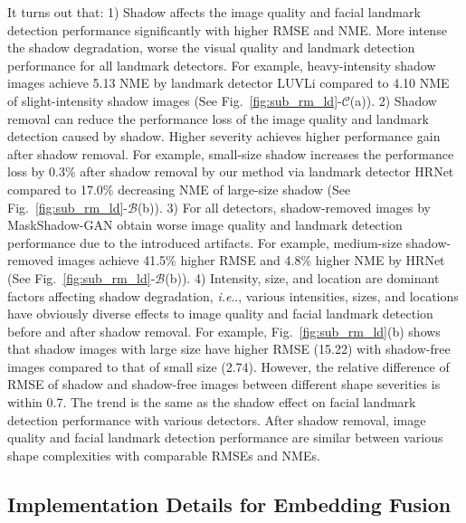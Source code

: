 \documentclass[10pt,twocolumn,letterpaper]{article}
\makeatletter
\newcommand{\figref}[1]{Fig.~\ref{#1}}
\DeclareRobustCommand\onedot{\futurelet\@let@token\@onedot}
\def\@onedot{\ifx\@let@token.\else.\null\fi\xspace}
\def\ie{\emph{i.e}\onedot} \def\Ie{\emph{I.e}\onedot}
\makeatother
\begin{document}
It turns out that: 1) Shadow affects the image quality and facial landmark detection performance significantly with higher RMSE and NME. More intense the shadow degradation, worse the visual quality and landmark detection performance for all landmark detectors. For example, heavy-intensity shadow images achieve 5.13 NME by landmark detector LUVLi compared to 4.10 NME of slight-intensity shadow images (See \figref{fig:sub_rm_ld}-$\mathcal{C}$(a)). 2) Shadow removal can reduce the performance loss of the image quality and landmark detection caused by shadow. Higher severity achieves higher performance gain after shadow removal. For example, small-size shadow increases the performance loss by 0.3\% after shadow removal by our method via landmark detector HRNet compared to 17.0\% decreasing NME of large-size shadow (See \figref{fig:sub_rm_ld}-$\mathcal{B}$(b)). 3) For all detectors, shadow-removed images by MaskShadow-GAN obtain worse image quality and landmark detection performance due to the introduced artifacts. For example, medium-size shadow-removed images achieve 41.5\% higher RMSE and 4.8\% higher NME by HRNet (See \figref{fig:sub_rm_ld}-$\mathcal{B}$(b)). 4) Intensity, size, and location are dominant factors affecting shadow degradation, \ie, various intensities, sizes, and locations have obviously diverse effects to image quality and facial landmark detection before and after shadow removal. 
%
For example, \figref{fig:sub_rm_ld}(b) shows that shadow images with large size have higher RMSE (15.22) with shadow-free images compared to that of small size (2.74). However, the relative difference of RMSE of shadow and shadow-free images between different shape severities is within 0.7. The trend is the same as the shadow effect on facial landmark detection performance with various detectors. After shadow removal, image quality and facial landmark detection performance are similar between various shape complexities with comparable RMSEs and NMEs. 

%

\subsection{Implementation Details for Embedding Fusion}
\end{document}

